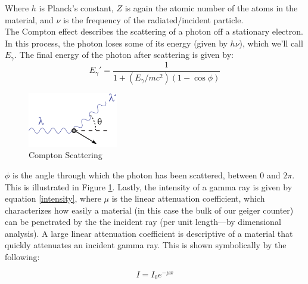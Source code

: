 \documentclass{amsart}
\begin{document}
Where $h$ is Planck's constant, $Z$ is again the atomic number of the atoms in the material, and $\nu$ is the frequency of the radiated/incident particle.\\
The Compton effect describes the scattering of a photon off a stationary electron. In this process, the photon loses some of its energy (given by $h\nu$), which we'll call $E_{\gamma}$. The final energy of the photon after scattering is given by:
\begin{equation}
    \label{compton}
    E_{\gamma}\prime = \dfrac{1}{1+(E_{\gamma}/mc^2)(1-\cos\phi)}
\end{equation}
\begin{figure}
    \includegraphics[width=0.35\textwidth]{compton.png}
    \caption{Compton Scattering}
    \label{fig:angle}
\end{figure}

$\phi$ is the angle through which the photon has been scattered, between $0$ and $2\pi$. This is illustrated in Figure \ref{fig:angle}. Lastly, the intensity of a gamma ray is given by equation \ref{intensity}, where $\mu$ is the linear attenuation coefficient, which characterizes how easily a material (in this case the bulk of our geiger counter) can be penetrated by the the incident ray (per unit length---by dimensional analysis). A large linear attenuation coefficient is descriptive of a material that quickly attenuates an incident gamma ray. This is shown symbolically by the following:

\begin{equation}
    I = I_0e^{-\mu x}
    \label{intensity}
\end{equation}
\end{document}
